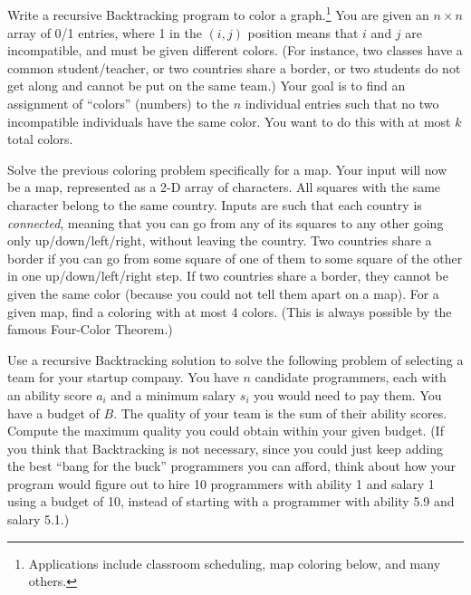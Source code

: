 \subsection{\HarderQuestions}
\begin{exercise}
  Write a recursive Backtracking program to color a
  graph.\footnote{Applications include classroom scheduling, map
    coloring below, and many others.}
  You are given an $n \times n$ array of 0/1 entries,
  where 1 in the $(i,j)$ position means that $i$ and $j$ are
  incompatible, and must be given different colors.
  (For instance, two classes have a common student/teacher,
  or two countries share a border, or two students do not get along
  and cannot be put on the same team.)
  Your goal is to find an assignment of ``colors'' (numbers) to the
  $n$ individual entries such that no two incompatible individuals
  have the same color.
  You want to do this with at most $k$ total colors.
\end{exercise}

\begin{exercise}
  Solve the previous coloring problem specifically for a map.
  Your input will now be a map, represented as a 2-D array of
  characters.
  All squares with the same character belong to the same country.
  Inputs are such that each country is \emph{connected}, meaning that
  you can go from any of its squares to any other going only
  up/down/left/right, without leaving the country.
  Two countries share a border if you can go from some square of one of
  them to some square of the other in one up/down/left/right step.
  If two countries share a border, they cannot be given the same color
  (because you could not tell them apart on a map).
  For a given map, find a coloring with at most 4 colors.
  (This is always possible by the famous Four-Color Theorem.)
\end{exercise}

\begin{exercise}
  Use a recursive Backtracking solution to solve the following
  problem of selecting a team for your startup company.
  You have $n$ candidate programmers,
  each with an ability score $a_i$ and a
  minimum salary $s_i$ you would need to pay them.
  You have a budget of $B$.
  The quality of your team is the sum of their ability scores.
  Compute the maximum quality you could obtain within your given
  budget.
  (If you think that Backtracking is not necessary, since you could
  just keep adding the best ``bang for the buck'' programmers you can
  afford, think about how your program would figure out to hire 10
  programmers with ability 1 and salary 1 using a budget of 10,
  instead of starting with a programmer with ability 5.9 and salary
  5.1.)
\end{exercise}